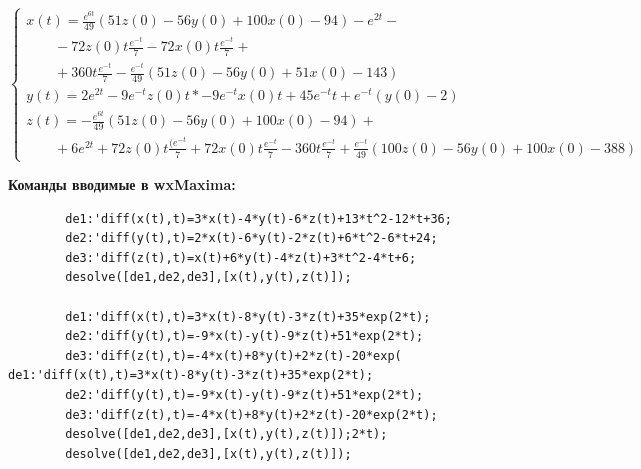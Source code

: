 \documentclass[a4paper, 12pt, oneside]{scrartcl}
\begin{document}
\begin{enumerate}
	\begin{equation*}
	\begin{cases}
	x(t)=\frac{e^{6t}}{49}(51z(0)-56y(0)+100x(0)-94)-e^{2t} -
	\nonumber\\ \quad \quad -72z(0)t\frac{e^{-t}}{7}-72x(0)t\frac{e^{-t}}{7}+
	\nonumber\\ \quad \quad  +360t\frac{e^{-t}}{7}-\frac{e^{-t}}{49}(51z(0)-56y(0)+51x(0)-143)
	\\
	y(t)=2e^{2t}-9e^{-t}z(0)t*-9e^{-t}x(0)t+45e^{-t}t+e^{-t}(y(0)-2)
	\\
	z(t)=-\frac{e^{6t}}{49}(51z(0)-56y(0)+100x(0)-94)+
	\nonumber\\ \quad \quad +6e^{2t}+72z(0)t\frac{(e^{-t}}{7}+72x(0)t\frac{e^{-t}}{7}-360t\frac{e^{-t}}{7}+\frac{e^{-t}}{49}(100z(0)-56y(0)+100x(0)-388)
	\end{cases}
	\end{equation*}	
		
	\textbf{Команды вводимые в wxMaxima: }
		\begin{verbatim}
		de1:'diff(x(t),t)=3*x(t)-4*y(t)-6*z(t)+13*t^2-12*t+36;
		de2:'diff(y(t),t)=2*x(t)-6*y(t)-2*z(t)+6*t^2-6*t+24;
		de3:'diff(z(t),t)=x(t)+6*y(t)-4*z(t)+3*t^2-4*t+6;
		desolve([de1,de2,de3],[x(t),y(t),z(t)]);
		
		de1:'diff(x(t),t)=3*x(t)-8*y(t)-3*z(t)+35*exp(2*t);
		de2:'diff(y(t),t)=-9*x(t)-y(t)-9*z(t)+51*exp(2*t);
		de3:'diff(z(t),t)=-4*x(t)+8*y(t)+2*z(t)-20*exp(		de1:'diff(x(t),t)=3*x(t)-8*y(t)-3*z(t)+35*exp(2*t);
		de2:'diff(y(t),t)=-9*x(t)-y(t)-9*z(t)+51*exp(2*t);
		de3:'diff(z(t),t)=-4*x(t)+8*y(t)+2*z(t)-20*exp(2*t);
		desolve([de1,de2,de3],[x(t),y(t),z(t)]);2*t);
		desolve([de1,de2,de3],[x(t),y(t),z(t)]);
		\end{verbatim}



	\end{enumerate}
\end{document}
